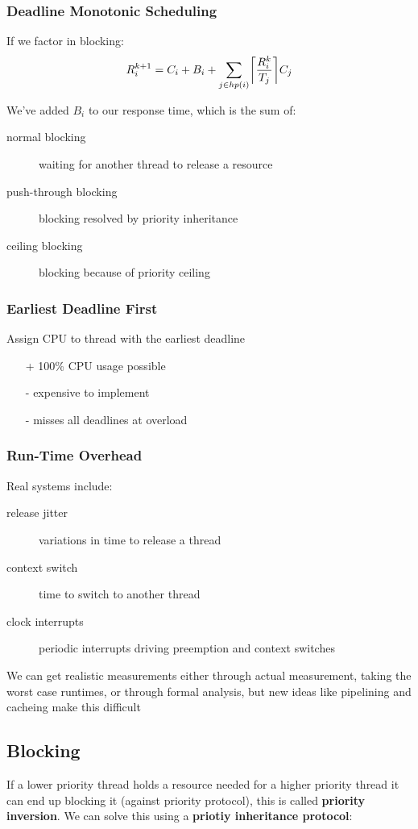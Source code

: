 \documentclass[]{article}
\theoremstyle{definition}
\DeclarePairedDelimiter{\ceil}{\lceil}{\rceil}
\begin{document}
	\subsubsection{Deadline Monotonic Scheduling}
	If we factor in blocking:
	\begin{align*}
		&R_i^{k+1} = C_i + B_i + \sum_{j \in hp(i)} \ceil*{\frac{R_i^k}{T_j}}C_j \\
	\end{align*}
	
	We've added $B_i$ to our response time, which is the sum of:
	\begin{description}
		\item[normal blocking] waiting for another thread to release a resource
		\item[push-through blocking] blocking resolved by priority inheritance
		\item[ceiling blocking] blocking because of priority ceiling
	\end{description}

	\subsubsection{Earliest Deadline First}
	Assign CPU to thread with the earliest deadline
	\begin{itemize}
		\item[+] 100\% CPU usage possible
		\item[-] expensive to implement
		\item[-] misses all deadlines at overload
	\end{itemize}

	\subsubsection{Run-Time Overhead}
	Real systems include:
	\begin{description}
		\item[release jitter] variations in time to release a thread
		\item[context switch] time to switch to another thread
		\item[clock interrupts] periodic interrupts driving preemption and context switches
	\end{description}

	We can get realistic measurements either through actual measurement, taking the worst case runtimes, or through formal analysis, but new ideas like pipelining and cacheing make this difficult
	\subsection{Blocking}
	If a lower priority thread holds a resource needed for a higher priority thread it can end up blocking it (against priority protocol), this is called \textbf{priority inversion}. We can solve this using a \textbf{priotiy inheritance protocol}:
\end{document}
